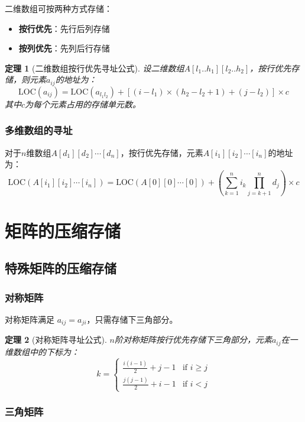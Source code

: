 \documentclass[12pt,a4paper]{amsart}
\newtheorem{theorem}{定理}[section]
\begin{document}
二维数组可按两种方式存储：
\begin{itemize}
\item \textbf{按行优先}：先行后列存储
\item \textbf{按列优先}：先列后行存储
\end{itemize}

\begin{theorem}[二维数组按行优先寻址公式]
设二维数组$A[l_1..h_1][l_2..h_2]$，按行优先存储，则元素$a_{ij}$的地址为：
$$\text{LOC}(a_{ij}) = \text{LOC}(a_{l_1l_2}) + [(i-l_1) \times (h_2-l_2+1) + (j-l_2)] \times c$$
其中$c$为每个元素占用的存储单元数。
\end{theorem}

\subsubsection{多维数组的寻址}

对于$n$维数组$A[d_1][d_2]\cdots[d_n]$，按行优先存储，元素$A[i_1][i_2]\cdots[i_n]$的地址为：
$$\text{LOC}(A[i_1][i_2]\cdots[i_n]) = \text{LOC}(A[0][0]\cdots[0]) + \left(\sum_{k=1}^{n} i_k \prod_{j=k+1}^{n} d_j\right) \times c$$

\section{矩阵的压缩存储}

\subsection{特殊矩阵的压缩存储}

\subsubsection{对称矩阵}

对称矩阵满足 $a_{ij} = a_{ji}$，只需存储下三角部分。

\begin{theorem}[对称矩阵寻址公式]
$n$阶对称矩阵按行优先存储下三角部分，元素$a_{ij}$在一维数组中的下标为：
$$k = \begin{cases}
\frac{i(i-1)}{2} + j - 1 & \text{if } i \geq j \\
\frac{j(j-1)}{2} + i - 1 & \text{if } i < j
\end{cases}$$
\end{theorem}

\subsubsection{三角矩阵}
\end{document}
